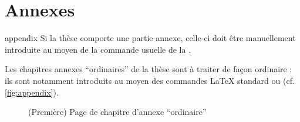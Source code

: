 \chapter{Annexes}\label{cha:annexes}

\begin{docCommand}{appendix}{}
  Si la thèse comporte une partie annexe, celle-ci doit être manuellement
  introduite au moyen de la commande usuelle  de la
  \nofrontmatter.
\end{docCommand}

Les chapitres annexes \enquote{ordinaires} de la thèse sont à traiter de façon
ordinaire : ils sont notamment introduits au moyen des commandes \LaTeX{}
standard  ou  (cf.
\vref{fig:appendix}).

\begin{figure}[htbp]
  \centering
  \caption[Chapitre d'annexe \enquote{ordinaire}]{(Première) Page de chapitre
    d'annexe \enquote{ordinaire}}
  \label{fig:appendix}
\end{figure}

%
\iffalse
\fi
